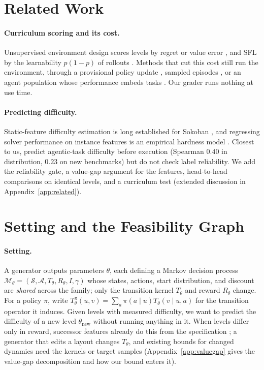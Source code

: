 \documentclass[twoside]{article}
\newcommand{\Tdist}{T}
\newcommand{\statespace}{\mathcal{S}}
\newcommand{\actionspace}{\mathcal{A}}
\begin{document}
\section{Related Work}
\label{sec:related-main}

\paragraph{Curriculum scoring and its cost.} Unsupervised environment design scores levels by regret or value error \citep{dennis2020emergent, jiang2021prioritized, parker2022evolving}, and SFL by the learnability $p(1-p)$ of rollouts \citep{rutherford2024no}. Methods that cut this cost still run the environment, through a provisional policy update \citep{yuan2026pace}, sampled episodes \citep{furuta2021policy}, or an agent population whose performance embeds tasks \citep{mahajan2024learning}. Our grader runs nothing at use time.

\paragraph{Predicting difficulty.} Static-feature difficulty estimation is long established for Sokoban \citep{ashlock2010evolution, vankreveld2015automated, kartal2016data}, and regressing solver performance on instance features is an empirical hardness model \citep{leytonbrown2009empirical, hutter2014algorithm}. Closest to us, \citet{krsteski2026predicting} predict agentic-task difficulty before execution (Spearman $0.40$ in distribution, $0.23$ on new benchmarks) but do not check label reliability. We add the reliability gate, a value-gap argument for the features, head-to-head comparisons on identical levels, and a curriculum test (extended discussion in Appendix~\ref{app:related}).

\section{Setting and the Feasibility Graph}
\label{sec:prelim}
\label{sec:dynamics-bound}

\paragraph{Setting.} A generator outputs parameters $\theta$, each defining a Markov decision process $\mathcal{M}_\theta = (\statespace, \actionspace, \Tdist_\theta, R_\theta, I, \gamma)$ whose states, actions, start distribution, and discount are \emph{shared} across the family; only the transition kernel $\Tdist_\theta$ and reward $R_\theta$ change. For a policy $\pi$, write $T^\pi_\theta(u,v) = \sum_a \pi(a\mid u)\Tdist_\theta(v \mid u,a)$ for the transition operator it induces. Given levels with measured difficulty, we want to predict the difficulty of a new level $\theta_{\text{new}}$ without running anything in it. When levels differ only in reward, successor features already do this from the specification \citep{barreto2017successor, barreto2018transfer}; a generator that edits a layout changes $\Tdist_\theta$, and existing bounds for changed dynamics need the kernels or target samples (Appendix~\ref{app:valuegap} gives the value-gap decomposition and how our bound enters it).
\end{document}
